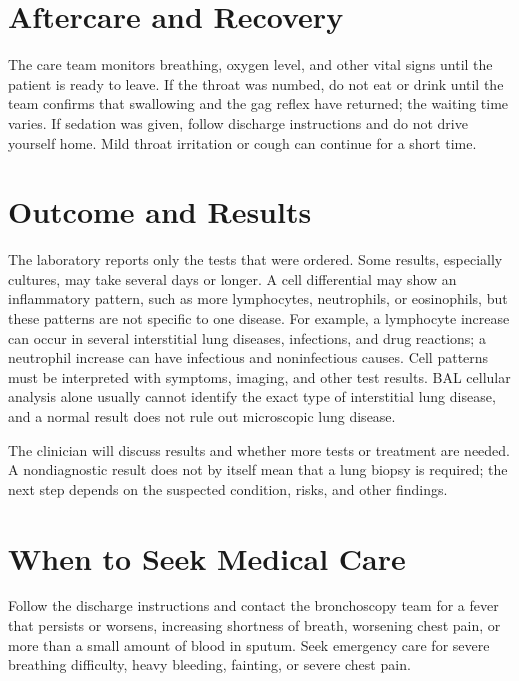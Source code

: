 \section*{Aftercare and Recovery}
The care team monitors breathing, oxygen level, and other vital signs until the patient is ready to leave. If the throat was numbed, do not eat or drink until the team confirms that swallowing and the gag reflex have returned; the waiting time varies. If sedation was given, follow discharge instructions and do not drive yourself home. Mild throat irritation or cough can continue for a short time.

\section*{Outcome and Results}
The laboratory reports only the tests that were ordered. Some results, especially cultures, may take several days or longer. A cell differential may show an inflammatory pattern, such as more lymphocytes, neutrophils, or eosinophils, but these patterns are not specific to one disease. For example, a lymphocyte increase can occur in several interstitial lung diseases, infections, and drug reactions; a neutrophil increase can have infectious and noninfectious causes. Cell patterns must be interpreted with symptoms, imaging, and other test results. BAL cellular analysis alone usually cannot identify the exact type of interstitial lung disease, and a normal result does not rule out microscopic lung disease.

The clinician will discuss results and whether more tests or treatment are needed. A nondiagnostic result does not by itself mean that a lung biopsy is required; the next step depends on the suspected condition, risks, and other findings.

\section*{When to Seek Medical Care}
Follow the discharge instructions and contact the bronchoscopy team for a fever that persists or worsens, increasing shortness of breath, worsening chest pain, or more than a small amount of blood in sputum. Seek emergency care for severe breathing difficulty, heavy bleeding, fainting, or severe chest pain.

